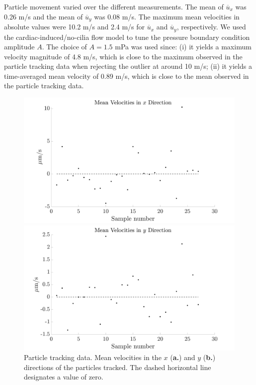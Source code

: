 \documentclass{WileyMSP-template}
\begin{document}
Particle movement varied over the different measurements. The mean of $\overline{u}_x$ was
0.26 \textmu m/s and the mean of $\overline{u}_y$ was 0.08 \textmu m/s.
The maximum mean velocities
in absolute values were 10.2 \textmu m/s and 2.4 \textmu m/s for
$\overline{u}_x$ and $\overline{u}_y$,
respectively. We used the cardiac-induced/no-cilia flow model to tune the
pressure boundary condition
amplitude $A$. The choice of $A=1.5$ mPa was used since: (i) it yields a
maximum velocity magnitude
of 4.8 \textmu m/s, which is close to the maximum observed in the
particle tracking data when
rejecting the outlier at around 10 \textmu m/s; (ii) it yields a time-averaged mean velocity
of 0.89 \textmu m/s, which is close to the mean observed in the particle tracking data.
\begin{figure}[H]
    \begin{minipage}[t]{0.49\textwidth}
        \includegraphics[width=\textwidth]{graphics/mean_velocities_x.png}
    \end{minipage}
    \begin{minipage}[t]{0.49\textwidth}
        \includegraphics[width=\textwidth]{graphics/mean_velocities_y.png}
    \end{minipage} 
    \caption{Particle tracking data. Mean velocities in
    the $x$ (\textbf{a.}) and $y$ (\textbf{b.}) directions of the particles tracked.
    The dashed horizontal line designates a value of zero.}\label{fig:particle_tracking_data}
\end{figure}
\end{document}
